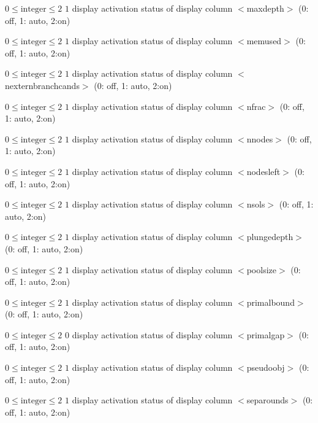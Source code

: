 %
{$0\leq\textrm{integer}\leq2$}%
{$1$}%
{display activation status of display column $<$maxdepth$>$ (0: off, 1: auto, 2:on)}%
{}

%
{$0\leq\textrm{integer}\leq2$}%
{$1$}%
{display activation status of display column $<$memused$>$ (0: off, 1: auto, 2:on)}%
{}

%
{$0\leq\textrm{integer}\leq2$}%
{$1$}%
{display activation status of display column $<$nexternbranchcands$>$ (0: off, 1: auto, 2:on)}%
{}

%
{$0\leq\textrm{integer}\leq2$}%
{$1$}%
{display activation status of display column $<$nfrac$>$ (0: off, 1: auto, 2:on)}%
{}

%
{$0\leq\textrm{integer}\leq2$}%
{$1$}%
{display activation status of display column $<$nnodes$>$ (0: off, 1: auto, 2:on)}%
{}

%
{$0\leq\textrm{integer}\leq2$}%
{$1$}%
{display activation status of display column $<$nodesleft$>$ (0: off, 1: auto, 2:on)}%
{}

%
{$0\leq\textrm{integer}\leq2$}%
{$1$}%
{display activation status of display column $<$nsols$>$ (0: off, 1: auto, 2:on)}%
{}

%
{$0\leq\textrm{integer}\leq2$}%
{$1$}%
{display activation status of display column $<$plungedepth$>$ (0: off, 1: auto, 2:on)}%
{}

%
{$0\leq\textrm{integer}\leq2$}%
{$1$}%
{display activation status of display column $<$poolsize$>$ (0: off, 1: auto, 2:on)}%
{}

%
{$0\leq\textrm{integer}\leq2$}%
{$1$}%
{display activation status of display column $<$primalbound$>$ (0: off, 1: auto, 2:on)}%
{}

%
{$0\leq\textrm{integer}\leq2$}%
{$0$}%
{display activation status of display column $<$primalgap$>$ (0: off, 1: auto, 2:on)}%
{}

%
{$0\leq\textrm{integer}\leq2$}%
{$1$}%
{display activation status of display column $<$pseudoobj$>$ (0: off, 1: auto, 2:on)}%
{}

%
{$0\leq\textrm{integer}\leq2$}%
{$1$}%
{display activation status of display column $<$separounds$>$ (0: off, 1: auto, 2:on)}%
{}

